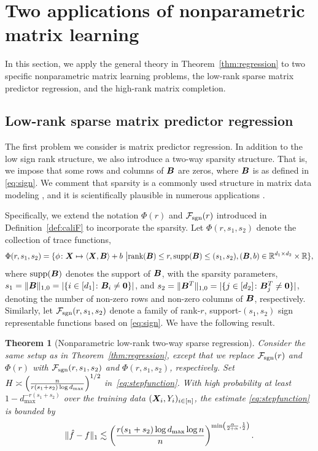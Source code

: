 \documentclass[11pt]{article}
\theoremstyle{plain}
\newtheorem{thm}{Theorem}[section]
\theoremstyle{definition}
\def\caliF{\tF_{\textup{sgn}}}
\def\caliF{\tF_{\textup{sgn}}}
\begin{document}
\section{Two applications of nonparametric matrix learning}
\label{sec:examples}

In this section, we apply the general theory in Theorem~\ref{thm:regression} to two specific nonparametric matrix learning problems, the low-rank sparse matrix predictor regression, and the high-rank matrix completion. 



\subsection{Low-rank sparse matrix predictor regression}
\label{sec:sparse}

The first problem we consider is matrix predictor regression. In addition to the low sign rank structure, we also introduce a two-way sparsity structure. That is, we impose that some rows and columns of $\bm B$ are zeros, where $\bm B$ is as defined in \eqref{eq:sign}. We comment that sparsity is a commonly used structure in matrix data modeling \citep{zhou2014regularized}, and it is scientifically plausible in numerous applications \citep{Zhang2015}.

Specifically, we extend the notation $\Phi(r)$ and $\caliF(r)$ introduced in Definition~\ref{def:caliF} to incorporate the sparsity. Let $\Phi(r,s_1,s_2)$ denote the collection of trace functions, 
\begin{align*} 
\Phi(r,s_1,s_2)=\{\phi\colon \mX\mapsto \langle \mX, \mB \rangle +b \ \big| \text{rank}(\mB)\leq r,  \text{supp}(\mB)\leq (s_1,s_2), (\mB,b)\in\mathbb{R}^{d_1\times d_2}\times \mathbb{R}\},
\end{align*}
where $\text{supp}(\bm B)$ denotes the support of $\bm B$, with the sparsity parameters, $s_1=\lVert\bm B\rVert_{1,0}=|\{i\in[d_1]\colon \bm B_i\neq \mathbf{0}\}|$, and $s_2=\lVert\bm B^T\rVert_{1,0}=|\{j\in[d_2]\colon \bm B^T_j\neq \mathbf{0}\}|$, denoting the number of non-zero rows and non-zero columns of $\bm B$, respectively. Similarly, let $\caliF(r,s_1,s_2)$ denote a family of rank-$r$, support-$(s_1,s_2)$ sign representable functions based on \eqref{eq:sign}. We have the following result. 

\begin{thm}[Nonparametric low-rank two-way sparse regression]\label{thm:sparse}
Consider the same setup as in Theorem~\ref{thm:regression}, except that we replace $\caliF(r)$ and $\Phi(r)$ with $\caliF(r,s_1,s_2)$ and $\Phi(r,s_1,s_2)$, respectively. Set $H\asymp {\left(n\over r(s_1+s_2)\log d_{\max}\right)}^{1/2}$ in~\eqref{eq:stepfunction}. With high probability at least $1-d_{\max}^{-r(s_1+s_2)}$ over the training data $(\bm X_i, Y_i)_{i\in[n]}$, the estimate \eqref{eq:stepfunction} is bounded by
\begin{equation}\label{eq:final2}
\lVert\hat f- f\rVert_1 \lesssim \left({r(s_1+s_2) \log d_{\max}\log n \over n}\right)^{\min\left({\alpha\over 2+\alpha}, {1\over 2}\right)}.
\end{equation}
\end{thm}
\end{document}
